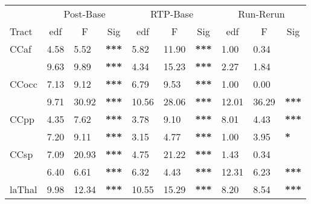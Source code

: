 
\begin{tabular}{llll|llllll}
 & \multicolumn{3}{c|}{Post-Base} & \multicolumn{3}{c|}{RTP-Base} & \multicolumn{3}{c}{Run-Rerun} \\ \cline{2-10}
Tract & \multicolumn{1}{c}{edf} & \multicolumn{1}{c}{F} & \multicolumn{1}{c|}{Sig} & \multicolumn{1}{c}{edf} & \multicolumn{1}{c}{F} & \multicolumn{1}{c}{Sig} & \multicolumn{1}{c}{edf} & \multicolumn{1}{c}{F} & \multicolumn{1}{c}{Sig} \\ \hline
\multicolumn{1}{l|}{CCaf} & 4.58 & 5.52 & \textbf{***} & 5.82 & 11.90 & \multicolumn{1}{l|}{\textbf{***}} & 1.00 & 0.34 & \textbf{} \\
\rowcolor[HTML]{C0C0C0}
\multicolumn{1}{l|}{\cellcolor[HTML]{C0C0C0}CCmot} & 9.63 & 9.89 & \textbf{***} & 4.34 & 15.23 & \multicolumn{1}{l|}{\cellcolor[HTML]{C0C0C0}\textbf{***}} & 2.27 & 1.84 & \textbf{} \\
\multicolumn{1}{l|}{CCocc} & 7.13 & 9.12 & \textbf{***} & 6.79 & 9.53 & \multicolumn{1}{l|}{\textbf{***}} & 1.00 & 0.00 & \textbf{} \\
\rowcolor[HTML]{C0C0C0}
\multicolumn{1}{l|}{\cellcolor[HTML]{C0C0C0}CCorb} & 9.71 & 30.92 & \textbf{***} & 10.56 & 28.06 & \multicolumn{1}{l|}{\cellcolor[HTML]{C0C0C0}\textbf{***}} & 12.01 & 36.29 & \textbf{***} \\
\multicolumn{1}{l|}{CCpp} & 4.35 & 7.62 & \textbf{***} & 3.78 & 9.10 & \multicolumn{1}{l|}{\textbf{***}} & 8.01 & 4.43 & \textbf{***} \\
\rowcolor[HTML]{C0C0C0}
\multicolumn{1}{l|}{\cellcolor[HTML]{C0C0C0}CCsf} & 7.20 & 9.11 & \textbf{***} & 3.15 & 4.77 & \multicolumn{1}{l|}{\cellcolor[HTML]{C0C0C0}\textbf{***}} & 1.00 & 3.95 & \textbf{*} \\
\multicolumn{1}{l|}{CCsp} & 7.09 & 20.93 & \textbf{***} & 4.75 & 21.22 & \multicolumn{1}{l|}{\textbf{***}} & 1.43 & 0.34 & \textbf{} \\
\rowcolor[HTML]{C0C0C0}
\multicolumn{1}{l|}{\cellcolor[HTML]{C0C0C0}CCtemp} & 6.40 & 6.61 & \textbf{***} & 6.32 & 4.43 & \multicolumn{1}{l|}{\cellcolor[HTML]{C0C0C0}\textbf{***}} & 12.31 & 6.23 & \textbf{***} \\
\multicolumn{1}{l|}{laThal} & 9.98 & 12.34 & \textbf{***} & 10.55 & 15.29 & \multicolumn{1}{l|}{\textbf{***}} & 8.20 & 8.54 & \textbf{***} \\

\end{tabular}
